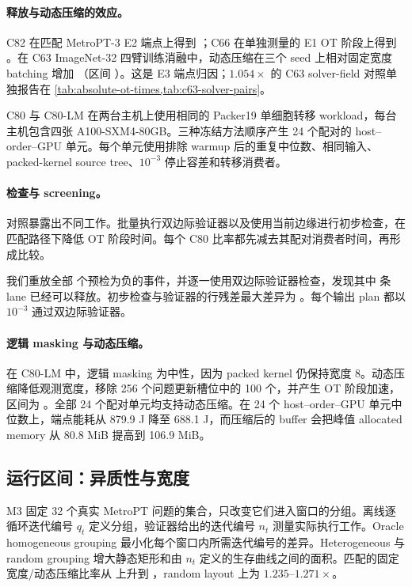 \paragraph{释放与动态压缩的效应。}
C82 在匹配 MetroPT-3 E2 端点上得到 \CMetroCorrectedEndpointSpeedup{}；C66 在单独测量的 E1 OT 阶段上得到 \CMetroRetirementOTSpeedup{}。在 C63 ImageNet-32 四臂训练消融中，动态压缩在三个 seed 上相对固定宽度 batching 增加 \CFeatureTrainingActiveOverStatic{}（区间 \CFeatureTrainingActiveOverStaticRange{}）。这是 E3 端点归因；$1.054\times$ 的 C63 solver-field 对照单独报告在 \cref{tab:absolute-ot-times,tab:c63-solver-pairs}。

C80 与 C80-LM 在两台主机上使用相同的 Packer19 单细胞转移 workload，每台主机包含四张 A100-SXM4-80GB。三种冻结方法顺序产生 24 个配对的 host--order--GPU 单元。每个单元使用排除 warmup 后的重复中位数、相同输入、packed-kernel source tree、$10^{-3}$ 停止容差和转移消费者。



\paragraph{检查与 screening。}
对照暴露出不同工作。批量执行双边际验证器以及使用当前边缘进行初步检查，在匹配路径下降低 OT 阶段时间。每个 C80 比率都先减去其配对消费者时间，再形成比较。

我们重放全部 \CPackerShadowNegatives{} 个预检为负的事件，并逐一使用双边际验证器检查，发现其中 \CPackerShadowMissedReady{} 条 lane 已经可以释放。初步检查与验证器的行残差最大差异为 \CPackerScreenDiscrepancy{}。每个输出 plan 都以 $10^{-3}$ 通过双边际验证器。

\paragraph{逻辑 masking 与动态压缩。}
在 C80-LM 中，逻辑 masking 为中性，因为 packed kernel 仍保持宽度 8。动态压缩降低观测宽度，移除 256 个问题更新槽位中的 100 个，并产生 \CPackerCompactionOTSpeedup{} OT 阶段加速，区间为 \CPackerCompactionOTRange{}。全部 24 个配对单元均支持动态压缩。在 24 个 host--order--GPU 单元中位数上，端点能耗从 879.9 J 降至 688.1 J，而压缩后的 buffer 会把峰值 allocated memory 从 80.8 MiB 提高到 106.9 MiB。

\subsection{运行区间：异质性与宽度}

M3 固定 32 个真实 MetroPT 问题的集合，只改变它们进入窗口的分组。离线逐循环迭代编号 $q_t$ 定义分组，验证器给出的迭代编号 $n_t$ 测量实际执行工作。Oracle homogeneous grouping 最小化每个窗口内所需迭代编号的差异。Heterogeneous 与 random grouping 增大静态矩形和由 $n_t$ 定义的生存曲线之间的面积。匹配的固定宽度/动态压缩比率从 \CMThreeHomogeneousRetirementSpeedup{} 上升到 \CMThreeHeterogeneousRetirementSpeedup{}，random layout 上为 $1.235$--$1.271\times$。

